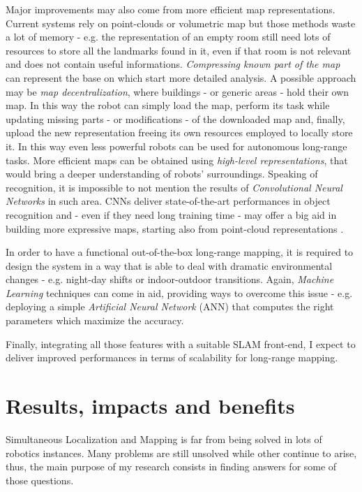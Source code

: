 \documentclass[10pt,a4paper, notitlepage]{report}
\begin{document}
Major improvements may also come from more efficient map representations. Current systems rely on point-clouds or volumetric map but those methods waste a lot of memory - e.g. the representation of an empty room still need lots of resources to store all the landmarks found in it, even if that room is not relevant and does not contain useful informations. \textit{Compressing known part of the map} \cite{lynen2015getoutofmylab} can represent the base on which start more detailed analysis. A possible approach may be \textit{map decentralization}, where buildings - or generic areas - hold their own map. In this way the robot can simply load the map, perform its task while updating missing parts - or modifications - of the downloaded map and, finally, upload the new representation freeing its own resources employed to locally store it. In this way even less powerful robots can be used for autonomous long-range tasks. More efficient maps can be obtained using \textit{high-level representations}, that would bring a deeper understanding of robots' surroundings. Speaking of recognition, it is impossible to not mention the results of \textit{Convolutional Neural Networks} \cite{krizhevsky2012alexnet} in such area. CNNs deliver state-of-the-art performances in object recognition and - even if they need long training time - may offer a big aid in building more expressive maps, starting also from point-cloud representations \cite{maturana2015voxnet}.

In order to have a functional out-of-the-box long-range mapping, it is required to design the system in a way that is able to deal with dramatic environmental changes - e.g. night-day shifts or indoor-outdoor transitions. Again, \textit{Machine Learning} techniques can come in aid, providing ways to overcome this issue - e.g. deploying a simple \textit{Artificial Neural Network} (ANN) that computes the right parameters which maximize the accuracy.

Finally, integrating all those features with a suitable SLAM front-end, I expect to deliver improved performances in terms of scalability for long-range mapping.

\section*{Results, impacts and benefits}
Simultaneous Localization and Mapping is far from being solved in lots of robotics instances. Many problems are still unsolved while other continue to arise, thus, the main purpose of my research consists in finding answers for some of those questions. 
\end{document}

